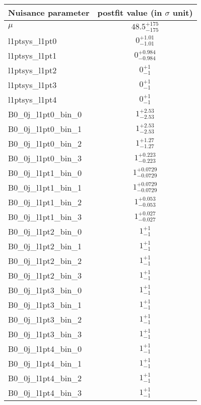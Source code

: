 
\begin{tabular}{|l|c|}
\hline
Nuisance parameter & postfit value (in $\sigma$ unit) \\\hline
$\mu$ & $48.5^{+175}_{-175}$ \\
l1ptsys\_l1pt0 & $0^{+1.01}_{-1.01}$ \\
l1ptsys\_l1pt1 & $0^{+0.984}_{-0.984}$ \\
l1ptsys\_l1pt2 & $0^{+1}_{-1}$ \\
l1ptsys\_l1pt3 & $0^{+1}_{-1}$ \\
l1ptsys\_l1pt4 & $0^{+1}_{-1}$ \\
B0\_0j\_l1pt0\_bin\_0 & $1^{+2.53}_{-2.53}$ \\
B0\_0j\_l1pt0\_bin\_1 & $1^{+2.53}_{-2.53}$ \\
B0\_0j\_l1pt0\_bin\_2 & $1^{+1.27}_{-1.27}$ \\
B0\_0j\_l1pt0\_bin\_3 & $1^{+0.223}_{-0.223}$ \\
B0\_0j\_l1pt1\_bin\_0 & $1^{+0.0729}_{-0.0729}$ \\
B0\_0j\_l1pt1\_bin\_1 & $1^{+0.0729}_{-0.0729}$ \\
B0\_0j\_l1pt1\_bin\_2 & $1^{+0.053}_{-0.053}$ \\
B0\_0j\_l1pt1\_bin\_3 & $1^{+0.027}_{-0.027}$ \\
B0\_0j\_l1pt2\_bin\_0 & $1^{+1}_{-1}$ \\
B0\_0j\_l1pt2\_bin\_1 & $1^{+1}_{-1}$ \\
B0\_0j\_l1pt2\_bin\_2 & $1^{+1}_{-1}$ \\
B0\_0j\_l1pt2\_bin\_3 & $1^{+1}_{-1}$ \\
B0\_0j\_l1pt3\_bin\_0 & $1^{+1}_{-1}$ \\
B0\_0j\_l1pt3\_bin\_1 & $1^{+1}_{-1}$ \\
B0\_0j\_l1pt3\_bin\_2 & $1^{+1}_{-1}$ \\
B0\_0j\_l1pt3\_bin\_3 & $1^{+1}_{-1}$ \\
B0\_0j\_l1pt4\_bin\_0 & $1^{+1}_{-1}$ \\
B0\_0j\_l1pt4\_bin\_1 & $1^{+1}_{-1}$ \\
B0\_0j\_l1pt4\_bin\_2 & $1^{+1}_{-1}$ \\
B0\_0j\_l1pt4\_bin\_3 & $1^{+1}_{-1}$ \\
\hline
\end{tabular}

